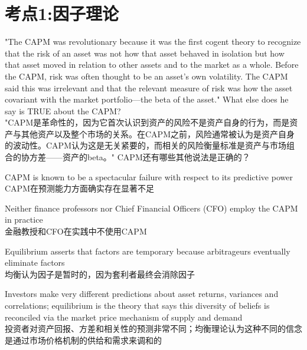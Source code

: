 \documentclass{article}
\newcounter{question} %
\begin{document}
 \tableofcontents %
\newpage




\section{考点1:因子理论}
\setcounter{question}{0}


\begin{question}
    "The CAPM was revolutionary because it was the first cogent theory to recognize that the risk of an asset was not how that asset behaved in isolation but how that asset moved in relation to other assets and to the market as a whole. Before the CAPM, risk was often thought to be an asset's own volatility. The CAPM said this was irrelevant and that the relevant measure of risk was how the asset covariant with the market portfolio—the beta of the asset." What else does he say is TRUE about the CAPM?\\
    "CAPM是革命性的，因为它首次认识到资产的风险不是资产自身的行为，而是资产与其他资产以及整个市场的关系。在CAPM之前，风险通常被认为是资产自身的波动性。CAPM认为这是无关紧要的，而相关的风险衡量标准是资产与市场组合的协方差——资产的beta。" CAPM还有哪些其他说法是正确的？
\end{question}

\begin{choices}
    \item CAPM is known to be a spectacular failure with respect to its predictive power\\
    CAPM在预测能力方面确实存在显著不足
    \item Neither finance professors nor Chief Financial Officers (CFO) employ the CAPM in practice\\
    金融教授和CFO在实践中不使用CAPM
    \item Equilibrium asserts that factors are temporary because arbitrageurs eventually eliminate factors\\
    均衡认为因子是暂时的，因为套利者最终会消除因子
    \item Investors make very different predictions about asset returns, variances and correlations; equilibrium is the theory that says this diversity of beliefs is reconciled via the market price mechanism of supply and demand\\
    投资者对资产回报、方差和相关性的预测非常不同；均衡理论认为这种不同的信念是通过市场价格机制的供给和需求来调和的
\end{choices}
\end{document}
